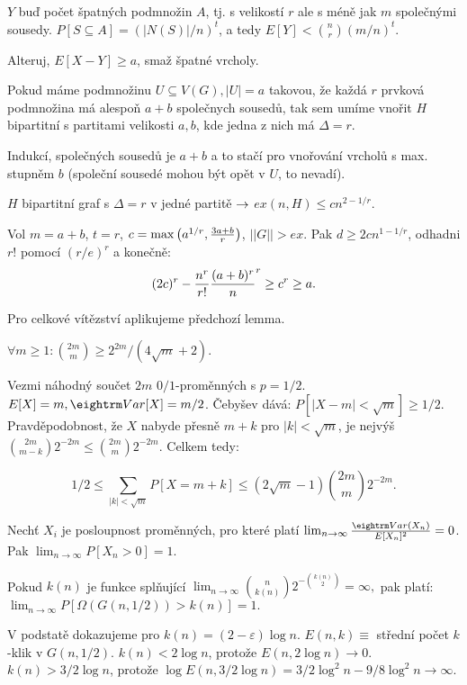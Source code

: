 $Y$ buď počet špatných podmnožin $A$, tj. s velikostí $r$ ale s méně jak $m$ společnými
sousedy. $P[S \subseteq A] = (|N(S)|/n)^t$, a tedy $E[Y] < {n \choose r} \left(m/n\right)^t$.

Alteruj,  $E[X-Y] \ge a$, smaž špatné vrcholy.

\lem{} Pokud máme podmnožinu $U \subseteq V(G), |U|=a$ takovou, že každá $r$ prvková podmnožina
má alespoň $a+b$ společnych sousedů, tak sem umíme vnořit $H$ bipartitní s partitami velikosti
$a,b$, kde jedna z nich má $\Delta = r$.

\prf{} Indukcí, společných sousedů je $a+b$ a to stačí pro vnořování vrcholů s max. stupněm
$b$ (společní sousedé mohou být opět v $U$, to nevadí).

\thm{} $H$ bipartitní graf s $\Delta = r$ v jedné partitě $\rightarrow$ $ex(n,H) \le cn^{2-1/r}$.

\prf{} Vol $m = a+b$, $t = r$, $c = \max\left(a^{1/r},{3a+b \over r}\right)$, $||G|| > ex$.
Pak $d \ge 2cn^{1-1/r}$, odhadni $r!$ pomocí $(r/e)^r$ a konečně:
$$ (2c)^r - {n^r \over r!} {(a+b)^r \over n}^r \ge c^r \ge a. $$

Pro celkové vítězství aplikujeme předchozí lemma.


\thm{} $\forall m\ge 1: {2m \choose m} \ge 2^{2m}/(4\sqrt{m}+2)$.

\prf{} Vezmi náhodný součet $2m$ $0/1$-proměnných s $p=1/2$. $E[X] = m, \var[X] = m/2$. Čebyšev dává: $P[|X-m| < \sqrt{m}] \ge 1/2$. 
Pravděpodobnost, že $X$ nabyde přesně $m+k$ pro $|k| < \sqrt{m}$, 
je nejvýš ${2m \choose m-k}2^{-2m} \le {2m \choose m}2^{-2m}$.
Celkem tedy:

$$1/2 \le \sum_{|k| < \sqrt{m}} P[X = m+k] \le (2\sqrt{m} -1) {2m \choose m} 2^{-2m}.$$

 Nechť $X_i$ je posloupnost proměnných, pro které platí $\lim_{n \rightarrow \infty} {\var(X_n) \over E[X_n]^2} = 0$.
Pak $\lim_{n \rightarrow \infty} P[X_n > 0] = 1.$

\lem{} Pokud $k(n)$ je funkce splňující
$ \lim_{n \rightarrow \infty} {n \choose k(n)} 2^{-{k(n) \choose 2}} = \infty, $
pak platí:
$ \lim_{n \rightarrow \infty} P[\Omega(G(n,1/2)) > k(n)] = 1.$

\prf{} V podstatě dokazujeme pro $k(n) = (2-\varepsilon) \log n$. $E(n,k) \equiv$
střední počet $k$-klik v $G(n,1/2)$.  $k(n) < 2 \log n$, protože $E(n,2 \log n)
\rightarrow 0$. $k(n) > 3/2 \log n$, protože $\log E(n,3/2 \log n) = 3/2 \log^2
n - 9/8 \log^2 n \rightarrow \infty$.

